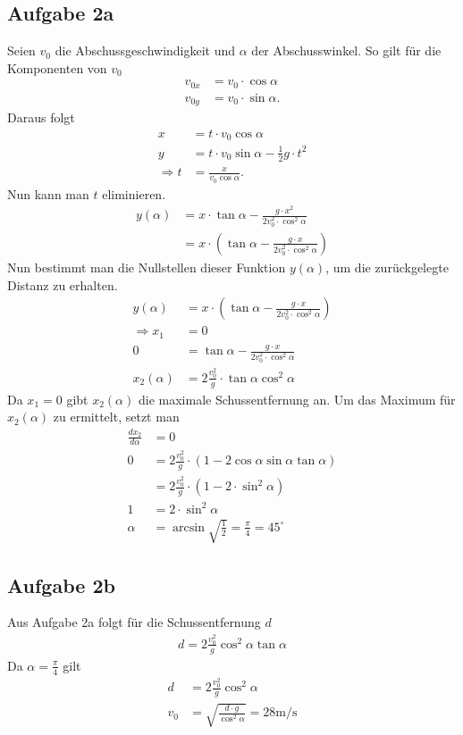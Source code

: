 \documentclass[a4paper,11pt]{article}
\begin{document}
\subsection*{Aufgabe 2a}
Seien $v_0$ die Abschussgeschwindigkeit und $\alpha$ der Abschusswinkel. So gilt für die Komponenten von $v_0$
\begin{align*}
  v_{0x} &= v_0 \cdot \cos\alpha\\
  v_{0y} &= v_0 \cdot \sin\alpha \mbox{.}
\end{align*}
Daraus folgt 
\begin{align*}
  x &= t \cdot v_0 \cos\alpha \\
  y &= t \cdot v_0 \sin\alpha - \frac{1}{2}g \cdot t^2 \\
  \Rightarrow t &= \frac{x}{v_0 \cos\alpha} \mbox{.}
\end{align*}
Nun kann man $t$ eliminieren.
\begin{align*}
  y(\alpha) &= x \cdot\tan\alpha - \frac{g \cdot x^2}{2v_0^2\cdot\cos^2\alpha} \\
  &= x \cdot\left(\tan\alpha - \frac{g \cdot x}{2v_0^2\cdot\cos^2\alpha}\right)
\end{align*}
Nun bestimmt man die Nullstellen dieser Funktion $y(\alpha)$, um die zurückgelegte Distanz zu erhalten.
\begin{align*}
  y(\alpha) &= x\cdot\left(\tan\alpha - \frac{g \cdot x}{2v_0^2\cdot\cos^2\alpha}\right) \\
  \Rightarrow x_1 &= 0 \\
  0 &=\tan\alpha - \frac{g \cdot x}{2v_0^2\cdot\cos^2\alpha} \\
  x_2(\alpha) &= 2\frac{v_0^2}{g} \cdot\tan\alpha\cos^2\alpha
\end{align*}
Da $x_1=0$ gibt $x_2(\alpha)$ die maximale Schussentfernung an. Um das Maximum für $x_2(\alpha)$ zu ermittelt, setzt man 
\begin{align*}
  \frac{dx_2}{d\alpha} &= 0\\
  0 &= 2\frac{v_0^2}{g}\cdot\left(1 - 2\cos\alpha\sin\alpha\tan\alpha\right)\\
  &= 2\frac{v_0^2}{g} \cdot\left(1 - 2\cdot\sin^2\alpha\right)\\
  1 &= 2\cdot\sin^2\alpha \\
  \alpha &= \arcsin\sqrt{\frac{1}{2}} = \frac{\pi}{4}=45^\circ
\end{align*}

\subsection*{Aufgabe 2b}
Aus Aufgabe 2a folgt für die Schussentfernung $d$
\begin{align*}
  d = 2\frac{v_0^2}{g} \cos^2\alpha\tan\alpha
\end{align*}
Da $\alpha = \frac{\pi}{4}$ gilt 
\begin{align*}
  d &= 2\frac{v_0^2}{g} \cos^2\alpha\\
  v_0 &= \sqrt{\frac{d\cdot g}{\cos^2\alpha}} = 28 \mbox{m/s}
\end{align*}
\end{document}
